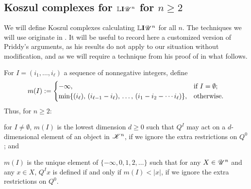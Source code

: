\documentclass[11pt]{article}
\newcommand{\LL}[1]{{\scrK}^{#1}}%
\newcommand{\nontop}[1]{\scrU^{#1}}%
\newcommand{\Ind}[2][]{\mathbf{I}{#2}_{#1}}%
\newcommand{\derived}{\mathbb{L}}
\newcommand{\LambdaOp}{Q}
\newcommand{\minDim}{m}
\begin{document}
\begin{KoszulComplexes}
\subsection*{Koszul complexes for $\derived\Ind{\nontop{n}}$ for $n\geq2$}
We will define Koszul complexes calculating $\derived\Ind{\nontop{n}}$ for all $n$. The techniques we will use originate in \cite{PriddyKoszul.pdf}. It will be useful to record here a customized version of Priddy's arguments, as his results do not apply to our situation without modification, and as we will require a technique from his proof of \cite[Thm 5.3]{PriddyKoszul.pdf} in what follows.

For $I=(i_1,\ldots,i_\ell)$ a sequence of nonnegative integers, define
\[\minDim(I):=\begin{cases}
-\infty,&\textup{if }I=\emptyset;\\
\min\{(i_{\ell}),\,(i_{\ell-1}-i_\ell),\,\ldots,\,(i_{1}-i_2-\cdots i_\ell)\},&\textup{otherwise}.
\end{cases}
\]
Thus, for $n\geq2$:
\begin{itemise}
\setlength{\parindent}{.25in}
\item  for $I\neq\emptyset$, $\minDim(I)$ is the lowest dimension $d\geq0$ such that $\LambdaOp^I$ may act on a $d$-dimensional element of an object in $\LL{n}$, if we ignore the extra restrictions on $\LambdaOp^0$; and
\item $m(I)$ is the unique element of $\{-\infty,0,1,2,\ldots\}$ such that for any $X\in\nontop{n}$ and any $x\in X$, $\LambdaOp^Ix$ is defined if and only if $m(I)<|x|$, if we ignore the extra restrictions on $\LambdaOp^0$.
\end{itemise}

\end{KoszulComplexes}
\end{document}
